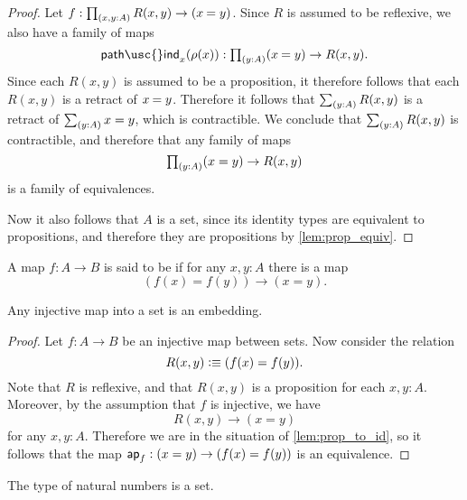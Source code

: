 \begin{proof}
Let $f:\prd{x,y:A}R(x,y)\to(\id{x}{y})$. 
Since $R$ is assumed to be reflexive, we also have a family of maps
\begin{equation*}
\mathsf{path\usc{}ind}_x(\rho(x)):\prd{y:A}(\id{x}{y})\to R(x,y).
\end{equation*}
Since each $R(x,y)$ is assumed to be a proposition, it therefore follows that each $R(x,y)$ is a retract of $\id{x}{y}$. Therefore it follows that $\sm{y:A}R(x,y)$ is a retract of $\sm{y:A}x=y$, which is contractible. We conclude that $\sm{y:A}R(x,y)$ is contractible, and therefore that any family of maps
\begin{equation*}
  \prd{y:A}(x=y)\to R(x,y)
\end{equation*}
is a family of equivalences.

Now it also follows that $A$ is a set, since its identity types are equivalent to propositions, and therefore they are propositions by \cref{lem:prop_equiv}. 
\end{proof}

\begin{defn}
  A map $f:A\to B$ is said to be  if for any $x,y:A$ there is a map
  \begin{equation*}
    (f(x)=f(y))\to (x=y).
  \end{equation*}
\end{defn}

\begin{cor}
  Any injective map into a set is an embedding.
\end{cor}

\begin{proof}
  Let $f:A\to B$ be an injective map between sets. Now consider the relation
  \begin{equation*}
    R(x,y)\vcentcolon\equiv (f(x)=f(y)).
  \end{equation*}
  Note that $R$ is reflexive, and that $R(x,y)$ is a proposition for each $x,y:A$. Moreover, by the assumption that $f$ is injective, we have
  \begin{equation*}
    R(x,y)\to (x=y)
  \end{equation*}
  for any $x,y:A$. Therefore we are in the situation of \cref{lem:prop_to_id}, so it follows that the map $\mathsf{ap}_{f} : (x=y)\to (f(x)=f(y))$ is an equivalence.
\end{proof}

\begin{thm}\label{thm:eq_nat}
The type of natural numbers is a set.
\end{thm}

